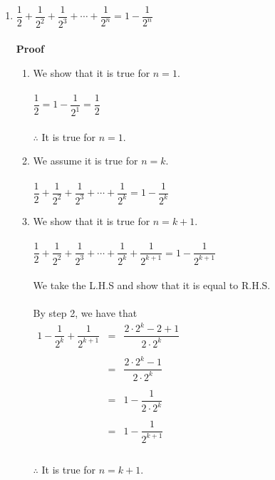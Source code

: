 \documentclass[11pt,a4paper]{article}
\begin{document}
\begin{enumerate}
\item[(c).] $\dfrac{1}{2}+\dfrac{1}{2^2}+\dfrac{1}{2^3}+\cdots +\dfrac{1}{2^n}=1-\dfrac{1}{2^n}$\\\\
\textbf{Proof}
\begin{enumerate}
\item[\textbf{Step 1:}] We show that it is true for $n=1$.\\\\
$\dfrac{1}{2}=1-\dfrac{1}{2^1}=\dfrac{1}{2}$\\\\
$\therefore$\hspace{1cm} It is true for $n=1$.\\
\item[\textbf{Step 2:}] We assume it is true for $n=k$.\\\\
$\dfrac{1}{2}+\dfrac{1}{2^2}+\dfrac{1}{2^3}+\cdots +\dfrac{1}{2^k}=1-\dfrac{1}{2^k}$\\
\item[\textbf{Step 3:}] We show that it is true for $n=k+1$.\\\\
$\dfrac{1}{2}+\dfrac{1}{2^2}+\dfrac{1}{2^3}+\cdots +\dfrac{1}{2^k}+\dfrac{1}{2^{k+1}}=1-\dfrac{1}{2^{k+1}}$\\\\
We take the L.H.S and show that it is equal to R.H.S.\\\\
By step 2, we have that\\
$
\begin{matrix}
1-\dfrac{1}{2^k}+\dfrac{1}{2^{k+1}} & = & \dfrac{2\cdot 2^k-2+1}{2\cdot 2^k}\\\\
                                    & = & \dfrac{2\cdot 2^k-1}{2\cdot 2^k}\\\\
                                    & = & 1-\dfrac{1}{2\cdot 2^k}\\\\
                                    & = & 1-\dfrac{1}{2^{k+1}}\\
\end{matrix}
$\\\\

$\therefore$\hspace{1cm} It is true for $n=k+1$.\\\\
\end{enumerate}




\end{enumerate}
\end{document}
